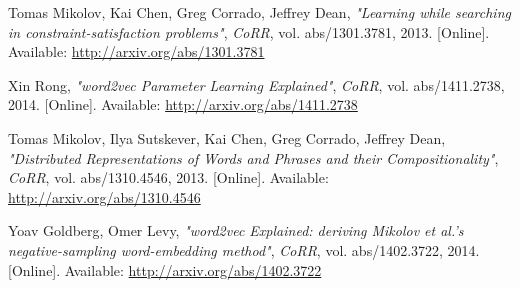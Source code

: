 \documentclass[conference, ]{IEEEtran}
\begin{document}
	\begin{thebibliography}{10}
		 Tomas Mikolov, Kai Chen, Greg Corrado, Jeffrey Dean, \emph{"Learning while searching in constraint-satisfaction problems"}, \textit{CoRR}, vol. abs/1301.3781, 2013. [Online]. Available: \url{http://arxiv.org/abs/1301.3781}
		
		 Xin Rong, \emph{"word2vec Parameter Learning Explained"}, \textit{CoRR}, vol. abs/1411.2738, 2014. [Online]. Available: \url{http://arxiv.org/abs/1411.2738}
		
		 Tomas Mikolov, Ilya Sutskever, Kai Chen, Greg Corrado, Jeffrey Dean, \emph{"Distributed Representations of Words and Phrases and their Compositionality"}, \textit{CoRR}, vol. abs/1310.4546, 2013. [Online]. Available: \url{http://arxiv.org/abs/1310.4546}
		
		 Yoav Goldberg, Omer Levy, \emph{"word2vec Explained: deriving Mikolov et al.'s negative-sampling word-embedding method"}, \textit{CoRR}, vol. abs/1402.3722, 2014. [Online]. Available: \url{http://arxiv.org/abs/1402.3722}
	\end{thebibliography}
\end{document}
